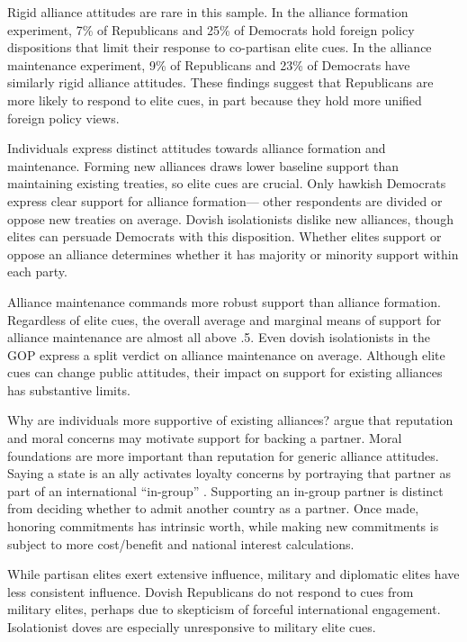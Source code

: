 \documentclass[12pt]{article}
\begin{document}
Rigid alliance attitudes are rare in this sample.
In the alliance formation experiment, 7\% of Republicans and 25\% of Democrats hold foreign policy dispositions that limit their response to co-partisan elite cues. 
In the alliance maintenance experiment, 9\% of Republicans and 23\% of Democrats have similarly rigid alliance attitudes.
These findings suggest that Republicans are more likely to respond to elite cues, in part because they hold more unified foreign policy views.


Individuals express distinct attitudes towards alliance formation and maintenance. 
Forming new alliances draws lower baseline support than maintaining existing treaties, so elite cues are crucial. 
Only hawkish Democrats express clear support for alliance formation--- other respondents are divided or oppose new treaties on average.
Dovish isolationists dislike new alliances, though elites can persuade Democrats with this disposition. 
Whether elites support or oppose an alliance determines whether it has majority or minority support within each party. 


Alliance maintenance commands more robust support than alliance formation. 
Regardless of elite cues, the overall average and marginal means of support for alliance maintenance are almost all above .5. 
Even dovish isolationists in the GOP express a split verdict on alliance maintenance on average.
Although elite cues can change public attitudes, their impact on support for existing alliances has substantive limits.


Why are individuals more supportive of existing alliances?
\citet{TomzWeeks2021} argue that reputation and moral concerns may motivate support for backing a partner.
Moral foundations are more important than reputation for generic alliance attitudes. 
Saying a state is an ally activates loyalty concerns by portraying that partner as part of an international ``in-group'' \citep[pg. 814]{TomzWeeks2021}. 
Supporting an in-group partner is distinct from deciding whether to admit another country as a partner.
Once made, honoring commitments has intrinsic worth, while making new commitments is subject to more cost/benefit and national interest calculations.


While partisan elites exert extensive influence, military and diplomatic elites have less consistent influence. 
Dovish Republicans do not respond to cues from military elites, perhaps due to skepticism of forceful international engagement.
Isolationist doves are especially unresponsive to military elite cues.
\end{document}
